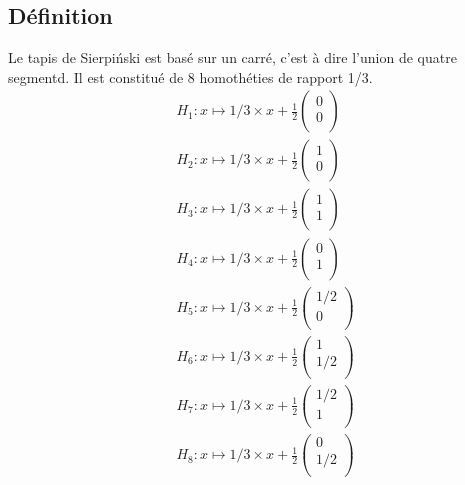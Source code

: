 \documentclass[a4paper, 12pt]{report}
\begin{document}
			\subsection{Définition}
				Le tapis de Sierpiński est basé sur un carré, c'est à dire l'union de quatre segmentd. Il est constitué de 8 homothéties de rapport 1/3.
				\begin{align*}
					&H_1:x\mapsto 1/3\times x+\frac{1}{2}\left(	\begin{array}{ccc}
																0\\
																0\\
															\end{array}\right)\\
					&H_2:x\mapsto 1/3\times x+\frac{1}{2}\left(	\begin{array}{ccc}
																	1\\
																	0\\
																\end{array}\right)\\
					&H_3:x\mapsto 1/3\times x+\frac{1}{2}\left(	\begin{array}{ccc}
																	1\\
																	1\\
																\end{array}\right)\\
					&H_4:x\mapsto 1/3\times x+\frac{1}{2}\left(	\begin{array}{ccc}
																	0\\
																	1\\
																\end{array}\right)\\
					&H_5:x\mapsto 1/3\times x+\frac{1}{2}\left(	\begin{array}{ccc}
																	1/2\\
																	0\\
																\end{array}\right)\\
					&H_6:x\mapsto 1/3\times x+\frac{1}{2}\left(	\begin{array}{ccc}
																	1\\
																	1/2\\
																\end{array}\right)\\
					&H_7:x\mapsto 1/3\times x+\frac{1}{2}\left(	\begin{array}{ccc}
																	1/2\\
																	1\\
																\end{array}\right)\\
					&H_8:x\mapsto 1/3\times x+\frac{1}{2}\left(	\begin{array}{ccc}
																	0\\
																	1/2\\
																\end{array}\right)
				\end{align*}
\end{document}
